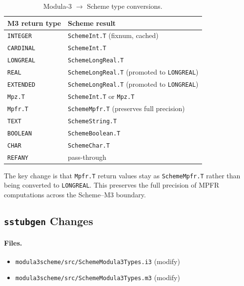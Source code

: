 \documentclass[12pt]{article}
\begin{document}
\begin{table}[htbp]
\centering
\begin{tabular}{ll}
\toprule
\textbf{M3 return type} & \textbf{Scheme result} \\
\midrule
{\tt INTEGER}  & {\tt SchemeInt.T} (fixnum, cached) \\
{\tt CARDINAL} & {\tt SchemeInt.T} \\
{\tt LONGREAL} & {\tt SchemeLongReal.T} \\
{\tt REAL}     & {\tt SchemeLongReal.T} (promoted to {\tt LONGREAL}) \\
{\tt EXTENDED} & {\tt SchemeLongReal.T} (promoted to {\tt LONGREAL}) \\
{\tt Mpz.T}    & {\tt SchemeInt.T} or {\tt Mpz.T} \\
{\tt Mpfr.T}   & {\tt SchemeMpfr.T} (preserves full precision) \\
{\tt TEXT}     & {\tt SchemeString.T} \\
{\tt BOOLEAN}  & {\tt SchemeBoolean.T} \\
{\tt CHAR}     & {\tt SchemeChar.T} \\
{\tt REFANY}   & pass-through \\
\bottomrule
\end{tabular}
\caption{Modula-3 $\to$ Scheme type conversions.}
\label{tab:to-scheme}
\end{table}

\noindent The key change is that {\tt Mpfr.T} return values stay as
{\tt SchemeMpfr.T} rather than being converted to {\tt LONGREAL}.
This preserves the full precision of MPFR computations across the
Scheme--M3 boundary.

\subsection{{\tt sstubgen} Changes}

\paragraph{Files.}
\begin{itemize}[nosep]
\item {\tt modula3scheme/src/SchemeModula3Types.i3} (modify)
\item {\tt modula3scheme/src/SchemeModula3Types.m3} (modify)
\end{itemize}
\end{document}
